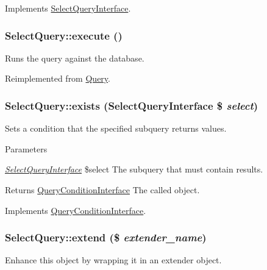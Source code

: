 Implements \hyperlink{interfaceSelectQueryInterface_aae70694b2ee2b596a7b7d3e2c25814ee}{SelectQueryInterface}.\hypertarget{classSelectQuery_a06e4212057c140773970e3c34b0b696d}{
\subsubsection[{execute}]{\setlength{\rightskip}{0pt plus 5cm}SelectQuery::execute ()}}
\label{classSelectQuery_a06e4212057c140773970e3c34b0b696d}
Runs the query against the database. 

Reimplemented from \hyperlink{classQuery_a9f2326187a94f3337a7838687b1e6929}{Query}.\hypertarget{classSelectQuery_a0b3d1a7b33abeef2af08601330a80844}{
\subsubsection[{exists}]{\setlength{\rightskip}{0pt plus 5cm}SelectQuery::exists ({\bf SelectQueryInterface} \$ {\em select})}}
\label{classSelectQuery_a0b3d1a7b33abeef2af08601330a80844}
Sets a condition that the specified subquery returns values.


\begin{DoxyParams}{Parameters}
\item[{\em \hyperlink{interfaceSelectQueryInterface}{SelectQueryInterface}}]\$select The subquery that must contain results.\end{DoxyParams}
\begin{DoxyReturn}{Returns}
\hyperlink{interfaceQueryConditionInterface}{QueryConditionInterface} The called object. 
\end{DoxyReturn}


Implements \hyperlink{interfaceQueryConditionInterface_a27a52b6e84393275ad2c54eaf1bd764a}{QueryConditionInterface}.\hypertarget{classSelectQuery_ab401a1ee7ce9ea726cf3856297a46532}{
\subsubsection[{extend}]{\setlength{\rightskip}{0pt plus 5cm}SelectQuery::extend (\$ {\em extender\_\-name})}}
\label{classSelectQuery_ab401a1ee7ce9ea726cf3856297a46532}
Enhance this object by wrapping it in an extender object.


